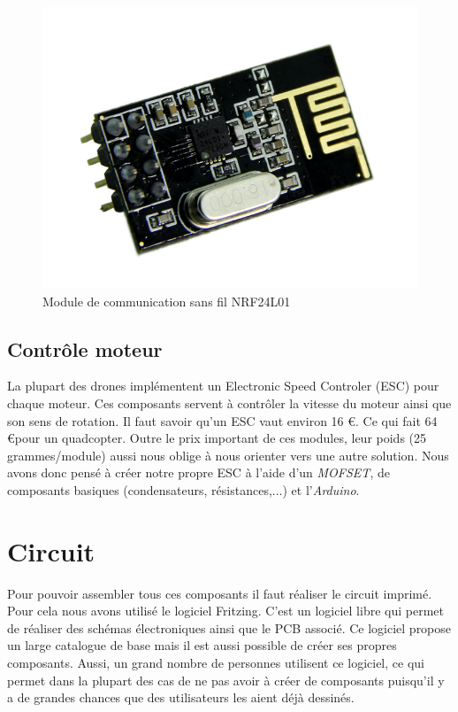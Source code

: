 \documentclass[a4paper,10pt]{report}
\begin{document}
	\begin{figure}[htbp]%
	  \centering
	  \includegraphics[scale = 0.35]{img/nrf24l01.jpg}
	  \caption{Module de communication sans fil NRF24L01}
	  \label{nrf24l01}
	\end{figure}
      
      \subsection{Contrôle moteur}
	La plupart des drones implémentent un Electronic Speed Controler (ESC) pour chaque moteur. Ces composants servent à contrôler 
	la vitesse du moteur ainsi que son sens de rotation. Il faut savoir qu'un ESC vaut environ 16 \euro. Ce qui fait 64 \euro pour 
	un quadcopter. Outre le prix important de ces modules, leur poids (25 grammes/module) aussi nous oblige à nous orienter vers 
	une autre solution. Nous avons donc pensé à créer notre propre ESC à l’aide d’un \textit{MOFSET}, de composants basiques 
	(condensateurs, résistances,...) et l’\textit{Arduino}.
	
    \section{Circuit}
      Pour pouvoir assembler tous ces composants il faut réaliser le circuit imprimé. Pour cela nous avons utilisé le logiciel Fritzing.
      C'est un logiciel libre qui permet de réaliser des schémas électroniques ainsi que le PCB associé. Ce logiciel propose un large
      catalogue de base mais il est aussi possible de créer ses propres composants. Aussi, un grand nombre de personnes utilisent ce
      logiciel, ce qui permet dans la plupart des cas de ne pas avoir à créer de composants puisqu'il y a de grandes chances que des
      utilisateurs les aient déjà dessinés.
      
\end{document}
